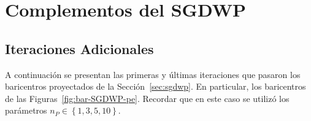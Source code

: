 \chapter{Complementos del SGDWP}\label{anx:sgdwp}  %

\section{Iteraciones Adicionales}\label{sec:sgdwp-iteraciones-adicionales}  %

A continuación se presentan las primeras y últimas iteraciones que pasaron los baricentros proyectados de la Sección~\ref{sec:sgdwp}. En particular, los baricentros de las Figuras~\ref{fig:bar-SGDWP-pe}.
Recordar que en este caso se utilizó los parámetros $n_P\in\left\{ 1, 3, 5, 10 \right\}$.

